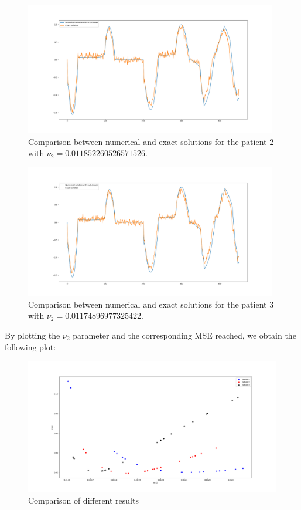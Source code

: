 \documentclass[11pt,a4paper]{article}
\begin{document}
\begin{figure}[H]
\begin{center}
\includegraphics[width = 11cm]{./patient_2_noise.png}
    \caption{Comparison between numerical and exact solutions for the patient 2 with $\nu_2 = 0.011852260526571526$.}
\end{center}
\end{figure}

\begin{figure}[H]
\begin{center}
\includegraphics[width = 11cm]{./patient_3_noise.png}
    \caption{Comparison between numerical and exact solutions for the patient 3 with $\nu_2 = 0.01174896977325422$.}
\end{center}
\end{figure}
By plotting the $\nu_2$ parameter and the corresponding MSE reached, we obtain the following plot:
\begin{figure}[H]
\begin{center}
\includegraphics[width = 15cm]{./nu.png}
    \caption{Comparison of different results}
\end{center}
\end{figure}
\end{document}

